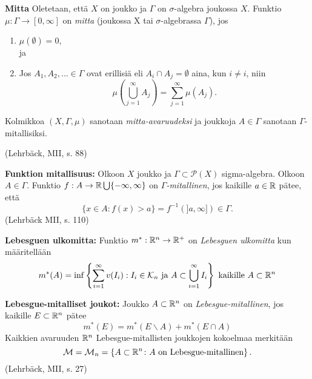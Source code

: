 \begin{definition}
    \textbf{Mitta} Oletetaan, että $X$ on joukko ja $\Gamma$ on $\sigma$-algebra joukossa $X$. Funktio $\mu : \Gamma \to [0, \infty]$ on \textit{mitta} (joukossa X tai $\sigma$-algebrassa $\Gamma$), jos 
    \begin{enumerate}
        \item $\mu(\emptyset) = 0$, \\
        ja
        \item Jos $A_1, A_2, ... \in \Gamma$ ovat erillisiä eli $A_i \cap A_j = \emptyset$ aina, kun $i \ne i$, niin
        $$\mu\left(\bigcup_{j=1}^\infty A_j \right) = \sum_{j=1}^\infty \mu(A_j).$$
    \end{enumerate}
    
    Kolmikkoa $(X,\Gamma, \mu)$ sanotaan \textit{mitta-avaruudeksi} ja joukkoja $A\in \Gamma$ sanotaan $\Gamma$-mitallisiksi.
    
    (Lehrbäck, MII, s. 88)
\end{definition}

\begin{definition}
    \textbf{Funktion mitallisuus:} Olkoon $X$ joukko ja $\Gamma \subset \mathcal P (X)$ sigma-algebra. Olkoon $A\in \Gamma$. Funktio $f: A \to \mathbb{R} \bigcup\{-\infty, \infty\}$ on \textit{$\Gamma$-mitallinen}, jos kaikille $a \in \mathbb{R}$ pätee, että
    \begin{equation*}
        \{x \in A : f(x) > a\} = f^{-1}(]a, \infty]) \in \Gamma.
    \end{equation*} (Lehrbäck MII, s. 110)
\end{definition}

\begin{definition}
    \textbf{Lebesguen ulkomitta:} Funktio $m^* : \mathbb{R}^n \to \mathbb{R}^+$ on \textit{Lebesguen ulkomitta} kun määritellään
    $$m^*(A) = \inf\left\{\sum_{i=1}^\infty v(I_i) : I_i \in \mathcal K_n \text{ ja } A \subset \bigcup_{i=1}^{\infty}I_i\right\} \text{ kaikille } A \subset \mathbb{R}^n$$
\end{definition}

\begin{definition}
    \textbf{Lebesgue-mitalliset joukot:} Joukko $A\subset \mathbb{R}^n$ on \textit{Lebesgue-mitallinen}, jos kaikille $E\subset \mathbb{R}^n$ pätee
    $$m^*(E) = m^*(E \backslash A) + m^*(E\cap A)$$
    Kaikkien avaruuden $\mathbb{R}^n$ Lebesgue-mitallisten joukkojen kokoelmaa merkitään 
    $$\mathcal M = \mathcal M_n = \left\{A\subset \mathbb{R}^n \colon A \text{ on Lebesgue-mitallinen} \right\}.$$
    (Lehrbäck, MII, s. 27)
\end{definition}

